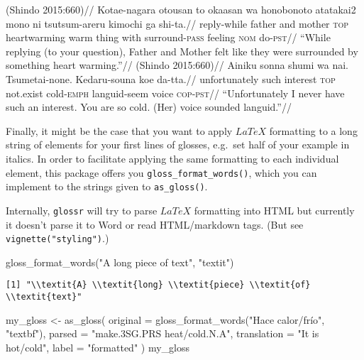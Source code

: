 \documentclass[
  letterpaper,
  DIV=11,
  numbers=noendperiod]{scrartcl}
\newenvironment{Shaded}{\begin{snugshade}}{\end{snugshade}}
\newcommand{\AttributeTok}[1]{\textcolor[rgb]{0.40,0.45,0.13}{#1}}
\newcommand{\FunctionTok}[1]{\textcolor[rgb]{0.28,0.35,0.67}{#1}}
\newcommand{\NormalTok}[1]{\textcolor[rgb]{0.00,0.23,0.31}{#1}}
\newcommand{\OtherTok}[1]{\textcolor[rgb]{0.00,0.23,0.31}{#1}}
\newcommand{\StringTok}[1]{\textcolor[rgb]{0.13,0.47,0.30}{#1}}
\begin{document}

\pex\label{jp} \a\label{heartwarming-jp} \begingl \glpreamble (Shindo
2015:660)// \gla Kotae-nagara otousan to okaasan wa honobonoto atatakai2
mono ni tsutsum-areru kimochi ga shi-ta.// \glb reply-while father and
mother \textsc{top} heartwarming warm thing with surround-\textsc{pass}
feeling \textsc{nom} do-\textsc{pst}// \glft ``While replying (to your
question), Father and Mother felt like they were surrounded by something
heart warming.''// \endgl  \a\label{languid-jp}
\begingl \glpreamble (Shindo 2015:660)// \gla Ainiku sonna shumi wa nai.
Tsumetai-none. Kedaru-souna koe da-tta.// \glb unfortunately such
interest \textsc{top} not.exist cold-\textsc{emph} languid-seem voice
\textsc{cop-pst}// \glft ``Unfortunately I never have such an interest.
You are so cold. (Her) voice sounded languid.''// \endgl  \xe

Finally, it might be the case that you want to apply \(LaTeX\)
formatting to a long string of elements for your first lines of glosses,
e.g.~set half of your example in italics. In order to facilitate
applying the same formatting to each individual element, this package
offers you \texttt{gloss\_format\_words()}, which you can implement to
the strings given to \texttt{as\_gloss()}.

Internally, \texttt{glossr} will try to parse \(LaTeX\) formatting into
HTML but currently it doesn't parse it to Word or read HTML/markdown
tags. (But see \texttt{vignette("styling")}.)

\begin{Shaded}
\begin{Highlighting}[]
\FunctionTok{gloss\_format\_words}\NormalTok{(}\StringTok{"A long piece of text"}\NormalTok{, }\StringTok{"textit"}\NormalTok{)}
\end{Highlighting}
\end{Shaded}

\begin{verbatim}
[1] "\\textit{A} \\textit{long} \\textit{piece} \\textit{of} \\textit{text}"
\end{verbatim}

\begin{Shaded}
\begin{Highlighting}[]
\NormalTok{my\_gloss }\OtherTok{\textless{}{-}} \FunctionTok{as\_gloss}\NormalTok{(}
  \AttributeTok{original =} \FunctionTok{gloss\_format\_words}\NormalTok{(}\StringTok{"Hace calor/frío"}\NormalTok{, }\StringTok{"textbf"}\NormalTok{),}
  \AttributeTok{parsed =} \StringTok{"make.3SG.PRS heat/cold.N.A"}\NormalTok{,}
  \AttributeTok{translation =} \StringTok{"\textquotesingle{}It is hot/cold\textquotesingle{}"}\NormalTok{,}
  \AttributeTok{label =} \StringTok{"formatted"}
\NormalTok{)}
\NormalTok{my\_gloss}
\end{Highlighting}
\end{Shaded}
\end{document}
